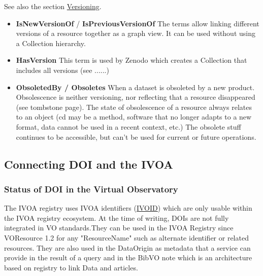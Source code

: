 \documentclass[11pt,a4paper]{ivoa}
\begin{document}
See also the section \hyperlink{versioning}{Versioning}.

\begin{itemize}
\item{} \textbf{IsNewVersionOf} / \textbf{IsPreviousVersionOf}\newline
The terms allow linking different versions of a resource together as a graph view. It can be used without using a Collection hierarchy.
\item{} \textbf{HasVersion}\newline
This term is used by Zenodo which creates a Collection that includes all versions (see ......)
\item{} \textbf{ObsoletedBy / Obsoletes}\newline
When a dataset is obsoleted by a new product. Obsolescence is neither versioning, nor reflecting that a resource disappeared (see tombstone page). \newline
The state of obsolescence of a resource always relates to an object (cd may be a method, software that no longer adapts to a new format, data cannot be used in a recent context, etc.)\newline
The obsolete stuff continues to be accessible, but can't be used for current or future operations.
\end{itemize}

\subsection{Connecting DOI and the IVOA}\hypertarget{connecting-doi-and-the-ivoa}{}\label{connecting-doi-and-the-ivoa}

\subsubsection{Status of DOI in the Virtual Observatory}\hypertarget{status-of-doi-in-the-virtual-observatory}{}\label{status-of-doi-in-the-virtual-observatory}

The IVOA registry uses IVOA identifiers (\href{https://www.ivoa.net/documents/IVOAIdentifiers/}{IVOID}) \citep{note:ivoid} which are only usable within the IVOA registry ecosystem. At the time of writing, DOIs are not fully integrated in VO standards.They can be used in the IVOA  Registry since VOResource 1.2 \citep{2018ivoa.spec.0625P} for any "ResourceName" such as  alternate identifier or related resources. They are also used in the DataOrigin\citep{note:dataorigin} as metadata that a service can provide in the result of a query and in the BibVO note \citep{note:bibvo} which is an architecture based on registry to link Data and articles.
\end{document}

